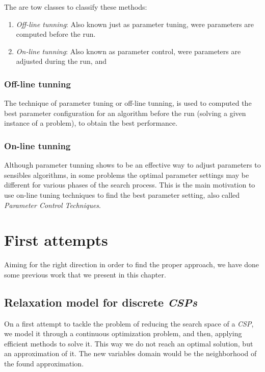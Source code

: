 \documentclass[a4paper]{book} %
\newcommand{\csp}{\textit{CSP}}
\newcommand{\csps}{\csp\textit{s}}
\begin{document}
The are tow classes to classify these methods: 
\begin{enumerate}
\item \textit{Off-line tunning}: Also known just as parameter tuning, were parameters are computed before the run.
\item \textit{On-line tunning}: Also known as parameter control, were parameters are adjusted during the run, and
\end{enumerate}

\subsection{Off-line tunning}

The technique of parameter tuning or off-line tunning, is used to computed the best parameter configuration for an algorithm before the run (solving a given instance of a problem), to obtain the best performance.

\subsection{On-line tunning}

Although parameter tunning shows to be an effective way to adjust parameters to sensibles algorithms, in some problems the optimal parameter settings may be different for various phases of the search process. This is the main motivation to use on-line tuning techniques to find the best parameter setting, also called \textit{Parameter Control Techniques}.

\chapter{First attempts}

Aiming for the right direction in order to find the proper approach, we have done some previous work that we present in this chapter.

\section{Relaxation model for discrete \csps}

On a first attempt to tackle the problem of reducing the search space of a \csp, we model it through a continuous optimization problem, and then, applying efficient methods to solve it. This way we do not reach an optimal solution, but an approximation of it. The new variables domain would be the neighborhood of the found approximation.
\end{document}
